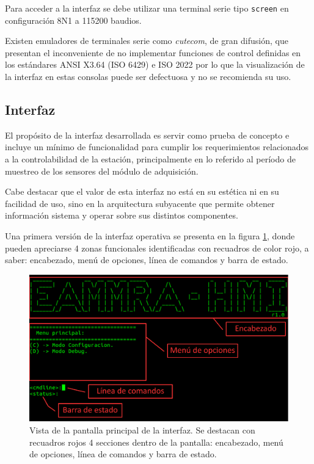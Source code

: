 Para acceder a la interfaz se debe utilizar una terminal serie tipo \texttt{screen} \citep{screen} en configuración 8N1 a 115200 baudios. 

Existen emuladores de terminales serie como \textit{cutecom}, de gran difusión, que presentan el inconveniente de no implementar funciones de control definidas en los estándares ANSI X3.64 (ISO 6429) e ISO 2022 por lo que la visualización de la interfaz en estas consolas puede ser defectuosa y no se recomienda su uso.


\subsection{Interfaz}
\label{subsec:interfaz}

El propósito de la interfaz desarrollada es servir como prueba de concepto e incluye un mínimo de funcionalidad para cumplir los requerimientos relacionados a la controlabilidad de la estación, principalmente en lo referido al período de muestreo de los sensores del módulo de adquisición. 

Cabe destacar que el valor de esta interfaz no está en su estética ni en su facilidad de uso, sino en la arquitectura subyacente que permite obtener información sistema y operar sobre sus distintos componentes.

Una primera versión de la interfaz operativa se presenta en la figura \ref{fig:interfaz_main}, donde pueden apreciarse 4 zonas funcionales identificadas con recuadros de color rojo, a saber: encabezado, menú de opciones, línea de comandos y barra de estado. 

\begin{figure}[htpb]
	\centering
	\includegraphics[width=\textwidth]{./Figures/interfaz_detalles.pdf}
	\caption[]{Vista de la pantalla principal de la interfaz. Se destacan con recuadros rojos 4 secciones dentro de la pantalla: encabezado, menú de opciones, línea de comandos y barra de estado.}
	\label{fig:interfaz_main}
\end{figure}

